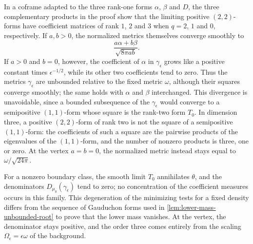 In a coframe adapted to the three rank-one forms $\alpha$, $\beta$ and $D$, the three complementary products in the proof show that the limiting positive $(2,2)$-forms have coefficient matrices of rank $1$, $2$ and $3$ when $q=2$, $1$ and $0$, respectively. If $a,b>0$, the normalized metrics themselves converge smoothly to
\[
 \frac{a\alpha+b\beta}{\sqrt{8\pi ab}}.
\]
If $a>0$ and $b=0$, however, the coefficient of $\alpha$ in $\gamma_\epsilon$ grows like a positive constant times $\epsilon^{-1/2}$, while its other two coefficients tend to zero. Thus the metrics $\gamma_\epsilon$ are unbounded relative to the fixed metric $\omega$, although their squares converge smoothly; the same holds with $\alpha$ and $\beta$ interchanged. This divergence is unavoidable, since a bounded subsequence of the $\gamma_\epsilon$ would converge to a semipositive $(1,1)$-form whose square is the rank-two form $T_0$. In dimension three, a positive $(2,2)$-form of rank two is not the square of a semipositive $(1,1)$-form: the coefficients of such a square are the pairwise products of the eigenvalues of the $(1,1)$-form, and the number of nonzero products is three, one or zero. At the vertex $a=b=0$, the normalized metric instead stays equal to $\omega/\sqrt{24\pi}$.

For a nonzero boundary class, the smooth limit $T_0$ annihilates $\theta$, and the denominators $D_{\mu_0}(\gamma_\epsilon)$ tend to zero; no concentration of the coefficient measures occurs in this family. This degeneration of the minimizing tests for a fixed density differs from the sequence of Gauduchon forms used in \cref{lem:lower-mass-unbounded-root} to prove that the lower mass vanishes. At the vertex, the denominator stays positive, and the order three comes entirely from the scaling $\Omega_\epsilon=\epsilon\omega$ of the background.
